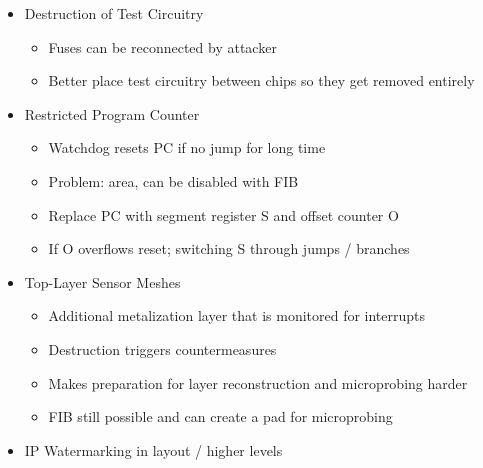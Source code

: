 \documentclass[11pt, paper=a4, twocolumn]{scrartcl}
\begin{document}
\begin{itemize}
\begin{itemize}
\begin{itemize}
						\end{itemize}
					\item Destruction of Test Circuitry
						\begin{itemize}
							\item Fuses can be reconnected by attacker
							\item Better place test circuitry between chips so they get removed entirely
						\end{itemize}
					\item Restricted Program Counter
						\begin{itemize}
							\item Watchdog resets PC if no jump for long time
							\item Problem: area, can be disabled with FIB
							\item Replace PC with segment register S and offset counter O
							\item If O overflows reset; switching S through jumps / branches
						\end{itemize}
					\item Top-Layer Sensor Meshes
						\begin{itemize}
							\item Additional metalization layer that is monitored for interrupts
							\item Destruction triggers countermeasures
							\item Makes preparation for layer reconstruction and microprobing harder
							\item FIB still possible and can create a pad for microprobing
						\end{itemize}
					\item IP Watermarking in layout / higher levels
				\end{itemize}

		\end{itemize}
\end{document}
